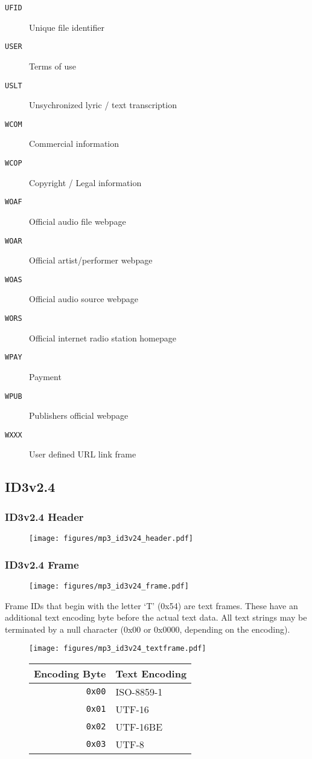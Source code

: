 \begin{multicols}{3}
{\begin{description}
\item[\texttt{UFID}] Unique file identifier
\item[\texttt{USER}] Terms of use
\item[\texttt{USLT}] Unsychronized lyric / text transcription
\item[\texttt{WCOM}] Commercial information
\item[\texttt{WCOP}] Copyright / Legal information
\item[\texttt{WOAF}] Official audio file webpage
\item[\texttt{WOAR}] Official artist/performer webpage
\item[\texttt{WOAS}] Official audio source webpage
\item[\texttt{WORS}] Official internet radio station homepage
\item[\texttt{WPAY}] Payment
\item[\texttt{WPUB}] Publishers official webpage
\item[\texttt{WXXX}] User defined URL link frame
\end{description}
}
\end{multicols}

\subsection{ID3v2.4}
\subsubsection{ID3v2.4 Header}
\begin{figure}[h]
\texttt{[image: figures/mp3\_id3v24\_header.pdf]}
\end{figure}

\subsubsection{ID3v2.4 Frame}
\begin{figure}[h]
\texttt{[image: figures/mp3\_id3v24\_frame.pdf]}
\end{figure}
\par
\noindent
Frame IDs that begin with the letter `T' (0x54) are text frames.
These have an additional text encoding byte before the actual
text data.
All text strings may be terminated by a null character
(0x00 or 0x0000, depending on the encoding).
\begin{figure}[h]
\texttt{[image: figures/mp3\_id3v24\_textframe.pdf]}
\begin{tabular}{r|l}
Encoding Byte & Text Encoding \\
\hline
\texttt{0x00} & ISO-8859-1 \\
\texttt{0x01} & UTF-16 \\
\texttt{0x02} & UTF-16BE \\
\texttt{0x03} & UTF-8
\end{tabular}
\end{figure}

